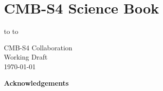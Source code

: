 \documentclass[titlepage]{tcibook}
\begin{document}


\def\bibname{References}

%

\raggedbottom


\parindent=0pt
\parskip=8pt
\setlength{\evensidemargin}{0pt}
\setlength{\oddsidemargin}{0pt}
\setlength{\marginparsep}{0.0in}
\setlength{\marginparwidth}{0.0in}
\marginparpush=0pt


\renewcommand{\chapname}{chap:intro_}
\renewcommand{\chapterdir}{.}
\renewcommand{\arraystretch}{1.25}
\addtolength{\arraycolsep}{-3pt}

\chapter*{CMB-S4 Science Book}
\vskip -9.5pt
\hbox to
\vskip-6.5pt
\hbox to

{\Large\bf
  \begin{center}
   CMB-S4 Collaboration\\
   Working Draft\\
   \bigskip
   \today
 \end{center}
}
\eject

\setcounter{page}{1}



\begin{center}
  {\Large \bf Acknowledgements}
\end{center}
  
\tableofcontents


\def\as#1{[{\bf AS:} {\it #1}] }


\end{document}
